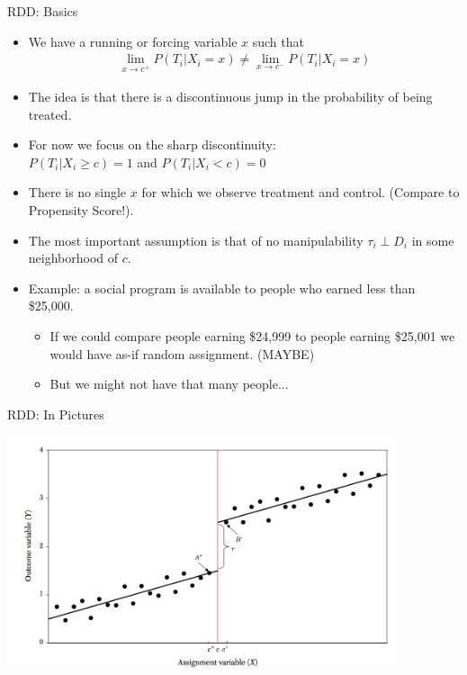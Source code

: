 \begin{frame}{RDD: Basics}
\begin{itemize}
\item We have a \alert{running or forcing variable} $x$ such that 
\begin{eqnarray*}
\lim_{x\rightarrow c^{+}} P(T_i | X_i = x) \neq \lim_{x\rightarrow c^{-}}P(T_i | X_i = x)
\end{eqnarray*}
\item The idea is that there is a \alert{discontinuous jump} in the \alert{probability of being treated}.
\item For now we focus on the \alert{sharp discontinuity}:\\
 $P(T_i | X_i \geq c) =1$ and $P(T_i | X_i < c) =0$
 \item There is no single $x$ for which we observe treatment and control. (Compare to Propensity Score!).
\item The most important assumption is that of \alert{no manipulability} $\tau_i \perp D_i$ in some neighborhood of $c$.
\item Example: a social program is available to people who earned less than \$25,000.
\begin{itemize}              
\item If we could compare people earning \$24,999 to people earning \$25,001 we would have as-if random assignment. (MAYBE)
\item But we might not have that many people...
\end{itemize}
\end{itemize}              
\end{frame}


\begin{frame}{RDD: In Pictures}
\begin{center}
\includegraphics[width=4.5in]{./resources/ll-fig1}
\end{center}
\end{frame}


